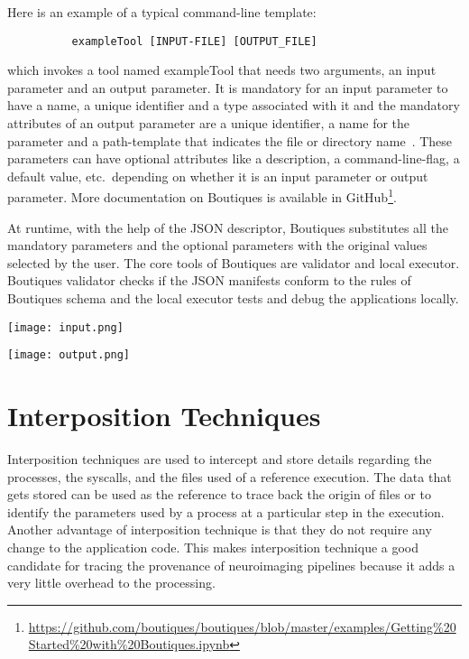 
Here is an example of a typical command-line template:

\begin{verbatim}
          exampleTool [INPUT-FILE] [OUTPUT_FILE]
\end{verbatim}

\noindent which invokes a tool named exampleTool that needs two arguments, an input parameter and an output parameter. It is mandatory for an input parameter to have a name, a unique identifier and a type associated with it and the mandatory attributes of an output parameter are a unique identifier, a name for the parameter and a path-template that indicates the file or directory name~\cite{boutiques}. These parameters can have optional attributes like a description, a command-line-flag, a default value, etc.\ depending on whether it is an input parameter or output parameter. More documentation on Boutiques is available in GitHub\footnote{\url{https://github.com/boutiques/boutiques/blob/master/examples/Getting\%20Started\%20with\%20Boutiques.ipynb}}.

At runtime, with the help of the JSON descriptor, Boutiques substitutes all the mandatory parameters and the optional parameters with the original values selected by the user. The core tools of Boutiques are validator and local executor. Boutiques validator checks if the JSON manifests conform to the rules of Boutiques schema and the local executor tests and debug the applications locally.

\begin{center}
\texttt{[image: input.png]}
\label{fig:input}
\end{center}

\begin{center}
\texttt{[image: output.png]}
\label{fig:output}
\end{center}

\section{Interposition Techniques}\label{Interposition}
Interposition techniques are used to intercept and store details regarding the processes, the syscalls, and the files used of a reference execution. 
The data that gets stored can be used as the reference to trace back the origin of files or to identify the parameters used by a process at a particular step in the execution. 
Another advantage of interposition technique is that they do not require any change to the application code. 
This makes interposition technique a good candidate for tracing the provenance of neuroimaging pipelines because it adds a very little overhead to the processing.

